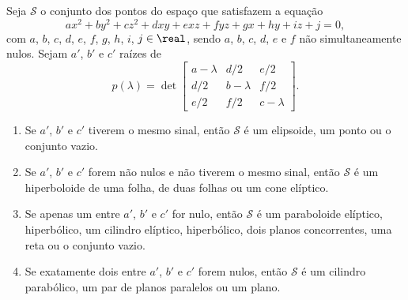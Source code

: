 \begin{teorema}
    Seja $\mathcal{S}$ o conjunto dos pontos do espaço que satisfazem a equação
    \[
        ax^2 + by^2 + cz^2 + dxy + exz + fyz + gx + hy + iz + j = 0,
    \]
    com $a$, $b$, $c$, $d$, $e$, $f$, $g$, $h$, $i$, $j \in \real$, sendo $a$, $b$, $c$, $d$, $e$ e $f$ não simultaneamente nulos. Sejam $a'$, $b'$ e $c'$ raízes de
    \[
        p(\lambda) = \det \begin{bmatrix}
            a - \lambda & d/2         & e/2         \\
            d/2         & b - \lambda & f/2         \\
            e/2         & f/2         & c - \lambda
        \end{bmatrix}.
    \]
    \begin{enumerate}[label=({\roman*})]
        \item Se $a'$, $b'$ e $c'$ tiverem o mesmo sinal, então $\mathcal{S}$ é um elipsoide, um ponto ou o conjunto vazio.
        \item Se $a'$, $b'$ e $c'$ forem não nulos e não tiverem o mesmo sinal, então $\mathcal{S}$ é um hiperboloide de uma folha, de duas folhas ou um cone elíptico.
        \item Se apenas um entre $a'$, $b'$ e $c'$ for nulo, então $\mathcal{S}$ é um paraboloide elíptico, hiperbólico, um cilindro elíptico, hiperbólico, dois planos concorrentes, uma reta ou o conjunto vazio.
        \item Se exatamente dois entre $a'$, $b'$ e $c'$ forem nulos, então $\mathcal{S}$ é um cilindro parabólico, um par de planos paralelos ou um plano.
    \end{enumerate}
\end{teorema}

